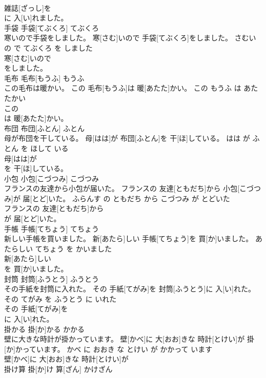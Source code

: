 \documentclass[8pt]{extreport}
\begin{document}
\begin{CJK}{UTF8}{min}
\\	雑誌[ざっし]を
\\	に 入[い]れました。			
\\	手袋	手袋[てぶくろ]	てぶくろ	
\\	寒いので手袋をしました。	寒[さむ]いので 手袋[てぶくろ]をしました。	さむい の で てぶくろ を しました	
\\	寒[さむ]いので
\\	をしました。			
\\	毛布	毛布[もうふ]	もうふ	
\\	この毛布は暖かい。	この 毛布[もうふ]は 暖[あたた]かい。	この もうふ は あたたかい	
\\	この
\\	は 暖[あたた]かい。			
\\	布団	布団[ふとん]	ふとん	
\\	母が布団を干している。	母[はは]が 布団[ふとん]を 干[ほ]している。	はは が ふとん を ほして いる	
\\	母[はは]が
\\	を 干[ほ]している。			
\\	小包	小包[こづつみ]	こづつみ	
\\	フランスの友達から小包が届いた。	フランスの 友達[ともだち]から 小包[こづつみ]が 届[とど]いた。	ふらんす の ともだち から こづつみ が とどいた	
\\	フランスの 友達[ともだち]から
\\	が 届[とど]いた。			
\\	手帳	手帳[てちょう]	てちょう	
\\	新しい手帳を買いました。	新[あたら]しい 手帳[てちょう]を 買[か]いました。	あたらしい てちょう を かいました	
\\	新[あたら]しい
\\	を 買[か]いました。			
\\	封筒	封筒[ふうとう]	ふうとう	
\\	その手紙を封筒に入れた。	その 手紙[てがみ]を 封筒[ふうとう]に 入[い]れた。	その てがみ を ふうとう に いれた	
\\	その 手紙[てがみ]を
\\	に 入[い]れた。			
\\	掛かる	掛[か]かる	かかる	
\\	壁に大きな時計が掛かっています。	壁[かべ]に 大[おお]きな 時計[とけい]が 掛[か]かっています。	かべ に おおき な とけい が かかって います	
\\	壁[かべ]に 大[おお]きな 時計[とけい]が
\\	掛け算	掛[か]け 算[ざん]	かけざん	

\end{CJK}
\end{document}
